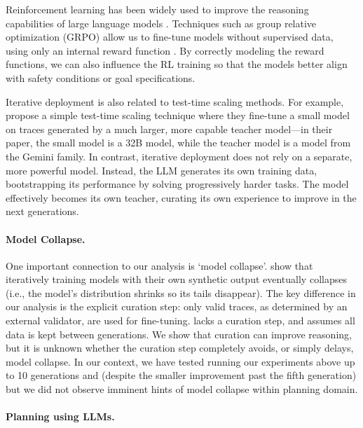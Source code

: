 Reinforcement learning has been widely used to improve the reasoning
capabilities of large language models
. Techniques such as group
relative optimization (GRPO) allow us to fine-tune models without supervised
data, using only an internal reward function \cite{shao-et-al-arxiv2024}. By
correctly modeling the reward functions, we can also influence the RL training
so that the models better align with safety conditions or goal specifications.

Iterative deployment is also related to test-time scaling methods. For example,
\citet{muennighoff-et-al-arxiv2025} propose a simple test-time scaling technique
where they fine-tune a small model on traces generated by a much larger, more
capable teacher model---in their paper, the small model is a 32B model, while
the teacher model is a model from the Gemini family. In contrast, iterative deployment
does not rely on a separate, more powerful model. Instead, the LLM generates its
own training data, bootstrapping its performance by solving progressively harder
tasks. The model effectively becomes its own teacher, curating its own
experience to improve in the next generations.


\paragraph{Model Collapse.}
One important connection to our analysis is `model collapse'. \citet{shumailov-et-al-nature2024} show that iteratively training
models with their own synthetic output eventually collapses (i.e., the model's
distribution shrinks so its tails disappear). The key difference in our analysis
is the explicit curation step: only valid traces, as determined by an external
validator, are used for fine-tuning.
\citet{shumailov-et-al-nature2024} lacks a curation step, and assumes all data is kept between generations.
We show that curation can improve reasoning, but it is unknown whether the curation step completely avoids, or simply delays, model collapse. In our context, we have
tested running our experiments above up to 10 generations and (despite the
smaller improvement past the fifth generation) but we did not observe imminent
hints of model collapse within planning domain.


\paragraph{Planning using LLMs.}

